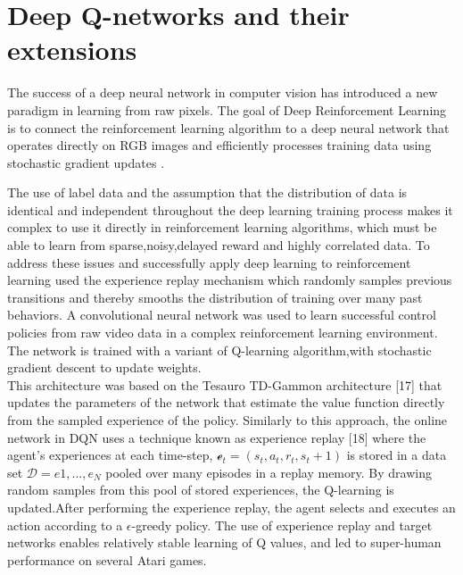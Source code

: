 \section{Deep Q-networks and their extensions}
\label{sec-drl}


The success of a deep neural network in computer vision has introduced a new
paradigm in learning from raw pixels.   The goal of Deep Reinforcement Learning
is to connect the reinforcement learning algorithm to a deep neural network
that operates directly on RGB images and efficiently processes training data
using stochastic gradient updates \cite{mnih2013atari}. 


The use of label data and the assumption that the distribution of data is
identical and independent throughout the deep learning training process makes
it complex to use it directly in reinforcement learning algorithms, which must
be able to learn from sparse,noisy,delayed reward and highly correlated data.
To address these issues and successfully apply deep learning to reinforcement
learning \cite{mnih2013atari} used the experience replay mechanism
\cite{mnih2015humanlevel} which randomly samples previous transitions and
thereby smooths the distribution of training over many past behaviors. A
convolutional neural network was used to learn successful control policies from
raw video data in a complex reinforcement learning environment. The network is
trained with a variant of Q-learning algorithm,with stochastic gradient descent
to update weights.\\

This architecture was based on the Tesauro TD-Gammon architecture [17] that
updates the parameters of the network that estimate the value function directly
from the sampled experience of the policy. Similarly to this approach, the
online network in DQN uses a technique known as experience replay [18] where
the  agent’s experiences at each time-step, $\mathcal e_t =
(s_t,a_t,r_t,s_t+1)$ is stored in a data set $\mathcal D = e1 , ..., e_N $
pooled over many  episodes in a replay memory. By drawing random samples from
this pool of stored experiences, the Q-learning is updated.After performing the
experience replay, the agent selects and executes an action according to a
$\epsilon$-greedy policy.
The use of experience replay and target networks enables 
relatively stable learning of Q values, 
and led to super-human performance on several Atari games.

